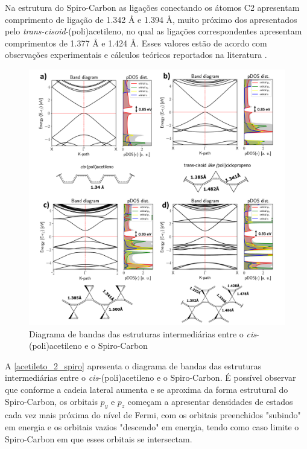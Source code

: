 	Na estrutura do Spiro-Carbon as ligações conectando os átomos C2 apresentam comprimento de ligação de 1.342 \AA{} e 1.394 \AA{}, muito próximo dos apresentados pelo \textit{trans-cisoid}-(poli)acetileno, no qual as ligações correspondentes apresentam comprimentos de 1.377 \AA{} e 1.424 \AA{}. Esses valores estão de acordo com observações experimentais e cálculos teóricos reportados na literatura \cite{chien1982estimate, chien2012polyacetylene, whangbo1979conjugated}.
	
	\begin{figure}[!ht]
		\centering
		\includegraphics[width=.9\linewidth]{capitulos/fig/results1/poliacetileno_2_spiro}
		\caption{Diagrama de bandas das estruturas intermediárias entre o \textit{cis}-(poli)acetileno e o Spiro-Carbon}
		\label{acetileto_2_spiro}
	\end{figure}

	A \autoref{acetileto_2_spiro} apresenta o diagrama de bandas das estruturas intermediárias entre o \textit{cis}-(poli)acetileno e o Spiro-Carbon. É possível observar que conforme a cadeia lateral aumenta e se aproxima da forma estrutural do Spiro-Carbon, os orbitais $p_y$ e $p_z$ começam a apresentar densidades de estados cada vez mais próxima do nível de Fermi, com os orbitais preenchidos "subindo" em energia e os orbitais vazios "descendo" em energia, tendo como caso limite o Spiro-Carbon em que esses orbitais se intersectam. 


